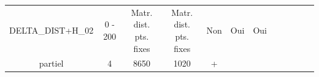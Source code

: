 \begin{landscape}
\begin{tabular}{|c|c|c|c|c|c|c|c|c|c|c|c|}
\begin{minipage}{3.5cm}\vspace{5mm}DELTA\_DIST+H\_02 \vspace{1mm} \end{minipage} &
\begin{minipage}{1.3cm}0 - 200 \end{minipage} &
\begin{minipage}{1.8cm}Matr. dist. pts. fixes \end{minipage} &
\begin{minipage}{1.8cm}Matr. dist. pts. fixes \end{minipage} &
\begin{minipage}{1.4cm}Non \end{minipage} &
\begin{minipage}{1.4cm}Oui \end{minipage} &
\begin{minipage}{2cm} Oui \end{minipage} &
\begin{minipage}{1.8cm}RMSE\\ partiel \end{minipage}&
\begin{minipage}{1.65cm} 4 \end{minipage}&
\begin{minipage}{1.2cm} 8650 \end{minipage} &
\begin{minipage}{1cm}1020 \end{minipage} &
\begin{minipage}{0.9cm}+ \end{minipage} \\  \hline


\end{tabular}
\end{landscape}
